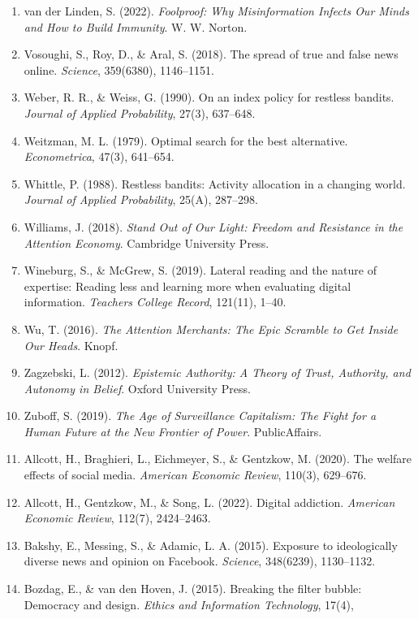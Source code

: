 \documentclass[
  11pt]{article}
\begin{document}
\begin{enumerate}
{  Guide to a Future Worth Wanting}. Oxford University Press.
\item
  van der Linden, S. (2022). \emph{Foolproof: Why Misinformation Infects
  Our Minds and How to Build Immunity}. W. W. Norton.
\item
  Vosoughi, S., Roy, D., \& Aral, S. (2018). The spread of true and
  false news online. \emph{Science}, 359(6380), 1146--1151.
\item
  Weber, R. R., \& Weiss, G. (1990). On an index policy for restless
  bandits. \emph{Journal of Applied Probability}, 27(3), 637--648.
\item
  Weitzman, M. L. (1979). Optimal search for the best alternative.
  \emph{Econometrica}, 47(3), 641--654.
\item
  Whittle, P. (1988). Restless bandits: Activity allocation in a
  changing world. \emph{Journal of Applied Probability}, 25(A),
  287--298.
\item
  Williams, J. (2018). \emph{Stand Out of Our Light: Freedom and
  Resistance in the Attention Economy}. Cambridge University Press.
\item
  Wineburg, S., \& McGrew, S. (2019). Lateral reading and the nature of
  expertise: Reading less and learning more when evaluating digital
  information. \emph{Teachers College Record}, 121(11), 1--40.
\item
  Wu, T. (2016). \emph{The Attention Merchants: The Epic Scramble to Get
  Inside Our Heads}. Knopf.
\item
  Zagzebski, L. (2012). \emph{Epistemic Authority: A Theory of Trust,
  Authority, and Autonomy in Belief}. Oxford University Press.
\item
  Zuboff, S. (2019). \emph{The Age of Surveillance Capitalism: The Fight
  for a Human Future at the New Frontier of Power}. PublicAffairs.
\item
  Allcott, H., Braghieri, L., Eichmeyer, S., \& Gentzkow, M. (2020). The
  welfare effects of social media. \emph{American Economic Review},
  110(3), 629--676.
\item
  Allcott, H., Gentzkow, M., \& Song, L. (2022). Digital addiction.
  \emph{American Economic Review}, 112(7), 2424--2463.
\item
  Bakshy, E., Messing, S., \& Adamic, L. A. (2015). Exposure to
  ideologically diverse news and opinion on Facebook. \emph{Science},
  348(6239), 1130--1132.
\item
  Bozdag, E., \& van den Hoven, J. (2015). Breaking the filter bubble:
  Democracy and design. \emph{Ethics and Information Technology}, 17(4),

\end{enumerate}
\end{document}
